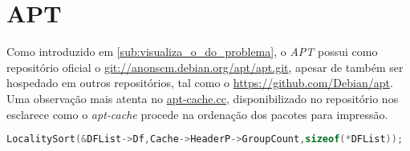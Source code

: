 \chapter{APT} %
\label{cha:apt}

Como introduzido em \ref{sub:visualiza_o_do_problema}, o \textit{APT} possui como repositório oficial o \url{git://anonscm.debian.org/apt/apt.git}, apesar de também ser hospedado em outros repositórios, tal como o \url{https://github.com/Debian/apt}. Uma observação mais atenta no \href{https://github.com/Debian/apt/blob/debian/experimental/cmdline/apt-cache.cc}{apt-cache.cc}, disponibilizado no repositório nos esclarece como o \textit{apt-cache} procede na ordenação dos pacotes para impressão.

\begin{lstlisting}[language=C++]
LocalitySort(&DFList->Df,Cache->HeaderP->GroupCount,sizeof(*DFList));
\end{lstlisting}

